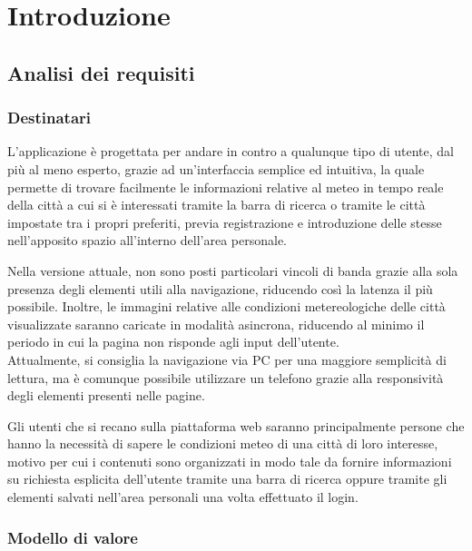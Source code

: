 \chapter{Introduzione}

\section{Analisi dei requisiti}

\subsection{Destinatari}

L'applicazione è progettata per andare in contro a qualunque tipo di utente, dal più al meno esperto, grazie ad 
un'interfaccia semplice ed intuitiva, la quale permette di trovare facilmente le informazioni relative al meteo in tempo reale 
della città a cui si è interessati tramite la barra di ricerca o tramite le città impostate tra i propri preferiti, previa 
registrazione e introduzione delle stesse nell'apposito spazio all'interno dell'area personale.

\vspace{5mm}

Nella versione attuale, non sono posti particolari vincoli di banda grazie alla sola presenza degli elementi utili alla 
navigazione, riducendo così la latenza il più possibile. Inoltre, le immagini relative alle condizioni metereologiche delle città 
visualizzate saranno caricate in modalità asincrona, riducendo al minimo il periodo in cui la pagina non risponde agli input 
dell'utente.\\
Attualmente, si consiglia la navigazione via PC per una maggiore semplicità di lettura, ma è comunque possibile utilizzare un 
telefono grazie alla responsività degli elementi presenti nelle pagine.

\vspace{5mm}

Gli utenti che si recano sulla piattaforma web saranno principalmente persone che hanno la necessità di sapere le condizioni 
meteo di una città di loro interesse, motivo per cui i contenuti sono organizzati in modo tale da fornire informazioni su 
richiesta esplicita dell'utente tramite una barra di ricerca oppure tramite gli elementi salvati nell'area personali una volta 
effettuato il login.


\subsection{Modello di valore}

